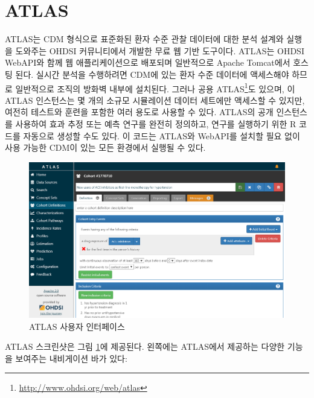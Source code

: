 \documentclass[10.5pt]{book}
\let\rmarkdownfootnote\footnote%
\def\footnote{\protect\rmarkdownfootnote}
\theoremstyle{definition}
\theoremstyle{definition}
\theoremstyle{definition}
\theoremstyle{remark}
\begin{document}
\section{ATLAS}\label{atlas}

ATLAS는 CDM 형식으로 표준화된 환자 수준 관찰 데이터에 대한 분석 설계와
실행을 도와주는 OHDSI 커뮤니티에서 개발한 무료 웹 기반 도구이다. ATLAS는
OHDSI WebAPI와 함께 웹 애플리케이션으로 배포되며 일반적으로 Apache
Tomcat에서 호스팅 된다. 실시간 분석을 수행하려면 CDM에 있는 환자 수준
데이터에 액세스해야 하므로 일반적으로 조직의 방화벽 내부에 설치된다.
그러나 공용 ATLAS\footnote{\url{http://www.ohdsi.org/web/atlas}}도
있으며, 이 ATLAS 인스턴스는 몇 개의 소규모 시뮬레이션 데이터 세트에만
액세스할 수 있지만, 여전히 테스트와 훈련을 포함한 여러 용도로 사용할 수
있다. ATLAS의 공개 인스턴스를 사용하여 효과 추정 또는 예측 연구를 완전히
정의하고, 연구를 실행하기 위한 R 코드를 자동으로 생성할 수도 있다. 이
코드는 ATLAS와 WebAPI를 설치할 필요 없이 사용 가능한 CDM이 있는 모든
환경에서 실행될 수 있다. 

\begin{figure}

{\centering \includegraphics[width=1\linewidth]{images/OhdsiAnalyticsTools/atlas} 

}

\caption{ATLAS 사용자 인터페이스}\label{fig:atlas}
\end{figure}

ATLAS 스크린샷은 그림 \ref{fig:atlas}에 제공된다. 왼쪽에는 ATLAS에서
제공하는 다양한 기능을 보여주는 내비게이션 바가 있다:
\end{document}
